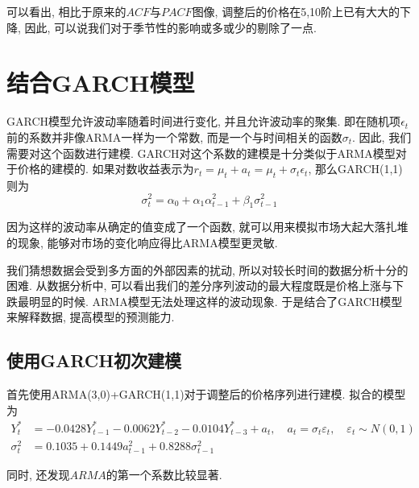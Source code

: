\documentclass[11pt]{article}
\begin{document}
\qquad 可以看出, 相比于原来的$ACF$与$PACF$图像, 调整后的价格在5,10阶上已有大大的下降, 因此, 可以说我们对于季节性的影响或多或少的剔除了一点. 
\section{结合GARCH模型}
\qquad GARCH模型允许波动率随着时间进行变化, 并且允许波动率的聚集. 即在随机项$\epsilon_t$前的系数并非像ARMA一样为一个常数, 而是一个与时间相关的函数$\sigma_t$. 因此, 我们需要对这个函数进行建模. GARCH对这个系数的建模是十分类似于ARMA模型对于价格的建模的. 如果对数收益表示为$r_t=\mu_t+a_t=\mu_t+\sigma_t\epsilon_t$, 那么GARCH(1,1)则为
\begin{equation*}
\sigma_t^2=\alpha_0+\alpha_1\alpha_{t-1}^2+\beta_1\sigma^2_{t-1}
\end{equation*}

\qquad 因为这样的波动率从确定的值变成了一个函数, 就可以用来模拟市场大起大落扎堆的现象, 能够对市场的变化响应得比ARMA模型更灵敏.

\qquad 我们猜想数据会受到多方面的外部因素的扰动, 所以对较长时间的数据分析十分的困难. 从数据分析中, 可以看出我们的差分序列波动的最大程度既是价格上涨与下跌最明显的时候. ARMA模型无法处理这样的波动现象. 于是结合了GARCH模型来解释数据, 提高模型的预测能力. 

\subsection{使用GARCH初次建模}
\qquad 首先使用ARMA(3,0)+GARCH(1,1)对于调整后的价格序列进行建模. 拟合的模型为
\begin{equation*}\begin{aligned}
    Y_{t}^{*} &=-0.0428 Y_{t-1}^{*}-0.0062 Y_{t-2}^{*}-0.0104 Y_{t-3}^{*}+a_{t}, \quad a_{t}=\sigma_{t} \varepsilon_{t}, \quad \varepsilon_{t} \sim N(0,1) \\
    \sigma_{t}^{2} &=0.1035+ 0.1449 a_{t-1}^{2}+0.8288 \sigma_{t-1}^{2}
\end{aligned}\end{equation*}

同时, 还发现$ARMA$的第一个系数比较显著. 
\end{document}
